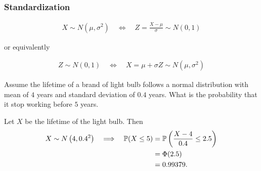 \begin{frame}[fragile,t]
	\frametitle{Standardization}
	\begin{center}
			\begin{align*}
				X\sim N\left(\mu,\sigma^2\right) \quad \Longleftrightarrow \quad
				Z = \frac{X-\mu}{\sigma} \sim N(0,1)
			\end{align*}
			\bigskip

			or equivalently
			\bigskip

			\begin{align*}
				Z\sim N\left(0,1\right) \quad \Longleftrightarrow \quad
				X=\mu + \sigma Z \sim N(\mu,\sigma^2)
			\end{align*}
	\end{center}
\end{frame}
\begin{frame}[fragile,t]
\begin{myexample}
	Assume the lifetime of a brand of light bulb follows a normal distribution with mean of $4$ years
	and standard deviation of  $0.4$ years. What is the probability that it stop working before  $5$
	years.
\end{myexample}
\pause
\bigskip
\begin{mysol}
	Let $X$ be the lifetime of the light bulb. Then
	\begin{align*}
		X\sim N\left(4,0.4^2\right) \quad \Longrightarrow \quad \mathbb{P}(X\le 5) & = \mathbb{P}\left(\frac{X-4}{0.4}\le 2.5 \right) \\
                                                                         & = \Phi(2.5)                                \\
                                                                         & = 0.99379.
	\end{align*}
	\myEnd
\end{mysol}
\end{frame}
